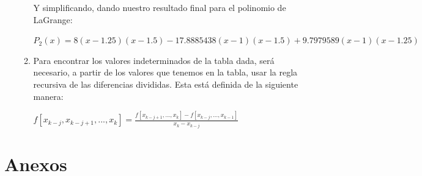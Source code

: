 \documentclass[english,notitlepage,letterpaper, 10pt]{article} %
\begin{document}
\begin{enumerate}
\begin{enumerate}
      Y simplificando, dando nuestro resultado final para el polinomio de LaGrange:

      \begin{center}
        \begin{math}
          P_2(x) = 8 (x-1.25)(x-1.5) - 17.8885438 (x-1)(x-1.5)  + 9.7979589 (x-1)(x-1.25) 
        \end{math}
      \end{center}

      \item Para encontrar los valores indeterminados de la tabla dada, será necesario, a partir de los valores que tenemos en la tabla, usar la regla recursiva de las diferencias divididas. Esta está definida de la siguiente manera:
      
      \begin{center}
        \begin{math}
          f[x_{k-j},x_{k-j+1}, ..., x_{k}] = \displaystyle \frac{ f[x_{k-j+1}, ..., x_{k}]- f[x_{k-j}, ..., x_{k-1}]}{x_k-x_{k-j}}
        \end{math}
      \end{center}


    \end{enumerate}

\end{enumerate}

\newpage

\section{Anexos}
\end{document}
